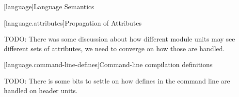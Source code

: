 
[language]{Language Semantics}

%

[language.attributes]{Propagation of Attributes}

\pnum TODO: There was some discussion about how different module units
may see different sets of attributes, we need to converge on how those
are handled.

[language.command-line-defines]{Command-line compilation definitions}

\pnum TODO: There is some bits to settle on how defines in the command
line are handled on header units.

%

